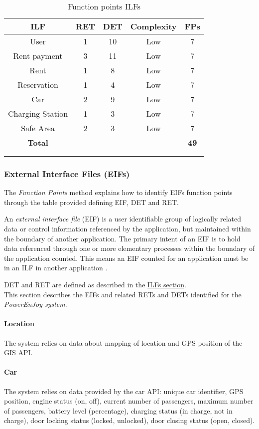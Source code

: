 \begin{longtable}{ccccc}
\toprule
\textbf{ILF}			&	RET	&	DET	&	Complexity  & \textbf{FPs}\\
\midrule
User			&	1	&	10		&	Low & 7 \\
Rent payment & 3 & 11 & Low & 7 \\
Rent & 1 & 8 & Low & 7 \\
Reservation & 1 & 4 & Low & 7 \\
Car & 2 & 9 & Low & 7\\
Charging Station & 1 & 3 & Low & 7 \\
Safe Area & 2 & 3 & Low & 7 \\
\midrule
\textbf{Total} & & & & \textbf{49}\\
\bottomrule \\
\caption{Function points ILFs}
\label{tbl:ilfFP}
\end{longtable}

\clearpage

\subsubsection{External Interface Files (EIFs)}
The \emph{Function Points} method explains how to identify EIFs function points through the table provided defining EIF, DET and RET.

An \emph{external interface file} (EIF) is a user identifiable group of logically related data or control information referenced by the application, but maintained within the boundary of another application. The primary intent of an EIF is to hold data referenced through one or more elementary processes within the boundary of the application counted. This means an EIF counted for an application must be in an ILF in another application \cite{FP}.

DET and RET are defined as described in the \hyperref[sec:ILFs]{ILFs section}.\\

This section describes the EIFs and related RETs and DETs identified for the \emph{PowerEnJoy system}.

\paragraph{Location} The system relies on data about mapping of location and GPS position of the GIS API.

\paragraph{Car} The system relies on data provided by the car API: unique car identifier, GPS position, engine status (on, off), current number of passengers, maximum number of passengers, battery level (percentage), charging status (in charge, not in charge), door locking status (locked, unlocked), door closing status (open, closed).

